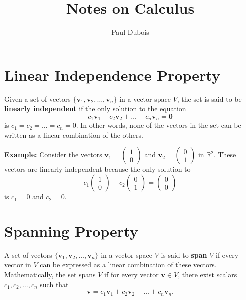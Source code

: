\documentclass[]{article}
\title{Notes on Calculus}
\author{Paul Dubois}
\date{}
\begin{document}
	
	\maketitle
	
	\begin{abstract}
		
	\end{abstract}
	
	\section{Linear Independence Property}
	
	Given a set of vectors $\{\mathbf{v}_1, \mathbf{v}_2, \dots, \mathbf{v}_n\}$ in a vector space $V$, the set is said to be \textbf{linearly independent} if the only solution to the equation
	\[
	c_1\mathbf{v}_1 + c_2\mathbf{v}_2 + \dots + c_n\mathbf{v}_n = \mathbf{0}
	\]
	is $c_1 = c_2 = \dots = c_n = 0$. In other words, none of the vectors in the set can be written as a linear combination of the others.
	
	\textbf{Example:} Consider the vectors $\mathbf{v}_1 = \begin{pmatrix} 1 \\ 0 \end{pmatrix}$ and $\mathbf{v}_2 = \begin{pmatrix} 0 \\ 1 \end{pmatrix}$ in $\mathbb{R}^2$. These vectors are linearly independent because the only solution to
	\[
	c_1\begin{pmatrix} 1 \\ 0 \end{pmatrix} + c_2\begin{pmatrix} 0 \\ 1 \end{pmatrix} = \begin{pmatrix} 0 \\ 0 \end{pmatrix}
	\]
	is $c_1 = 0$ and $c_2 = 0$.
	
	\section{Spanning Property}
	
	A set of vectors $\{\mathbf{v}_1, \mathbf{v}_2, \dots, \mathbf{v}_n\}$ in a vector space $V$ is said to \textbf{span} $V$ if every vector in $V$ can be expressed as a linear combination of these vectors. Mathematically, the set spans $V$ if for every vector $\mathbf{v} \in V$, there exist scalars $c_1, c_2, \dots, c_n$ such that
	\[
	\mathbf{v} = c_1\mathbf{v}_1 + c_2\mathbf{v}_2 + \dots + c_n\mathbf{v}_n.
	\]
	
\end{document}

